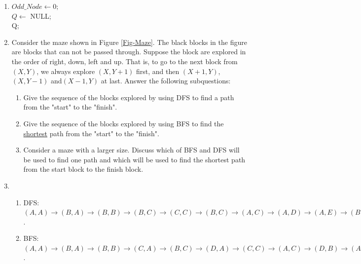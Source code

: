 \documentclass[12pt,a4paper]{article}
\makeatletter
\newtheorem*{solution}{Solution}
\theoremstyle{definition}
\renewenvironment{solution}[1][Solution] {\par\pushQED{\qed}\normalfont\topsep6\p@\@plus6\p@\relax\trivlist\item[\hskip\labelsep\bfseries#1\@addpunct{.}]\ignorespaces}{\popQED\endtrivlist\@endpefalse} \makeatother
\makeatother
\begin{document}
\begin{enumerate}
\begin{solution}
\begin{algorithm}[H]
		\BlankLine
		\caption{Find Euler Road}\label{Alg-quicksort}
		$Odd\_Node\leftarrow 0;$\\
		$Q\leftarrow$ NULL;\\
		\Return Q;
	\end{algorithm}
    \end{solution}
    \item Consider the maze shown in Figure \ref{Fig-Maze}. The black blocks in the figure are blocks that can not be passed through. Suppose the block are explored in the order of right, down, left and up. That is, to go to the next block from $(X,Y)$, we always explore $(X,Y+1)$ first, and then $(X+1,Y)$,$(X,Y-1)$ and$(X-1,Y)$ at last. Answer the following subquestions:
    \begin{enumerate}
        \item Give the sequence of the blocks explored by using DFS to find a path from the "start" to the "finish".
        \item Give the sequence of the blocks explored by using BFS to find the \underline{shortest} path from the "start" to the "finish".
        \item Consider a maze with a larger size. Discuss which of BFS and DFS will be used to find one path and which will be used to find the shortest path from the start block to the finish block.
    \end{enumerate}
    \begin{solution}
    ~\par
    \begin{enumerate}
        \item DFS:$(A,A)\rightarrow(B,A)\rightarrow(B,B)\rightarrow(B,C)\rightarrow(C,C)\rightarrow(B,C)\rightarrow(A,C)\rightarrow(A,D)\rightarrow(A,E)\rightarrow(B,E)\rightarrow(C,E)\rightarrow(D,E)\rightarrow(D,D)$.
        \item BFS:$(A,A)\rightarrow(B,A)\rightarrow(B,B)\rightarrow(C,A)\rightarrow(B,C)\rightarrow(D,A)\rightarrow(C,C)\rightarrow(A,C)\rightarrow(D,B)\rightarrow(A,D)\rightarrow(E,B)\rightarrow(A,E)\rightarrow(E,C)\rightarrow(B,E)\rightarrow(E,D)\rightarrow(C,E)\rightarrow(D,D)$.\\

\end{enumerate}
\end{solution}
\end{enumerate}
\end{document}
